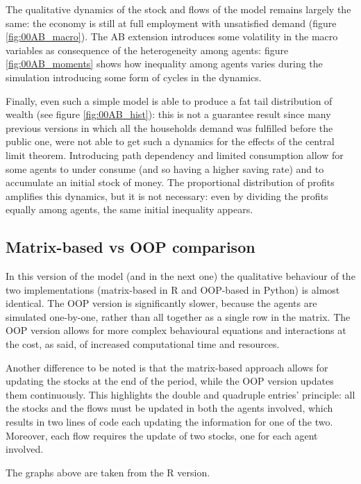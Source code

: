 The qualitative dynamics of the stock and flows of the model remains largely the same: the economy is still at full employment with unsatisfied demand (figure \ref{fig:00AB_macro}).
The AB extension introduces some volatility in the macro variables as consequence of the heterogeneity among agents: figure \ref{fig:00AB_moments} shows how inequality among agents varies during the simulation introducing some form of cycles in the dynamics.

Finally, even such a simple model is able to produce a fat tail distribution of wealth (see figure \ref{fig:00AB_hist}): this is not a guarantee result since many previous versions in which all the households demand was fulfilled before the public one, were not able to get such a dynamics for the effects of the central limit theorem.
Introducing path dependency and limited consumption allow for some agents to under consume (and so having a higher saving rate) and to accumulate an initial stock of money. The proportional distribution of profits amplifies this dynamics, but it is not necessary: even by dividing the profits equally among agents, the same initial inequality appears.

\subsection{Matrix-based vs OOP comparison}
In this version of the model (and in the next one) the qualitative behaviour of the two implementations (matrix-based in R and OOP-based in Python) is almost identical.
The OOP version is significantly slower, because the agents are simulated one-by-one, rather than all together as a single row in the matrix.
The OOP version allows for more complex behavioural equations and interactions at the cost, as said, of increased computational time and resources.

Another difference to be noted is that the matrix-based approach allows for updating the stocks at the end of the period, while the OOP version updates them continuously.
This highlights the double and quadruple entries' principle: all the stocks and the flows must be updated in both the agents involved, which results in two lines of code each updating the information for one of the two.
Moreover, each flow requires the update of two stocks, one for each agent involved.

The graphs above are taken from the R version.